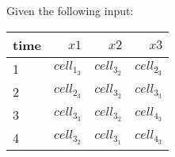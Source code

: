 
Given the following input:
\begin{table}[ht!]
\begin{center}
\begin{tabular}{|l|r|r|r|}
\hline
time & $\mathit{x}1$& $\mathit{x}2$& $\mathit{x}3$\\
\hline
1 & $\mathit{cell}_1_3$& $\mathit{cell}_3_2$& $\mathit{cell}_2_3$ \\
2 & $\mathit{cell}_2_3$& $\mathit{cell}_3_2$& $\mathit{cell}_3_3$ \\
3 & $\mathit{cell}_3_3$& $\mathit{cell}_3_2$& $\mathit{cell}_4_3$ \\
4 & $\mathit{cell}_3_2$& $\mathit{cell}_3_1$& $\mathit{cell}_4_3$ \\
\hline
\end{tabular}
\end{center}
\end{table}

